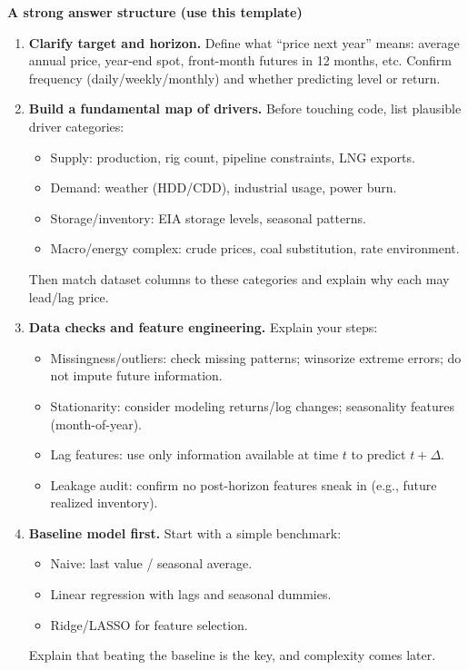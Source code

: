 \documentclass[11pt,letterpaper,openany]{book}
\begin{document}
\textbf{A strong answer structure (use this template)}
\begin{enumerate}
  \item \textbf{Clarify target and horizon.} Define what ``price next year'' means: average annual price, year-end spot, front-month futures in 12 months, etc. Confirm frequency (daily/weekly/monthly) and whether predicting level or return.

  \item \textbf{Build a fundamental map of drivers.} Before touching code, list plausible driver categories:
  \begin{itemize}
    \item Supply: production, rig count, pipeline constraints, LNG exports.
    \item Demand: weather (HDD/CDD), industrial usage, power burn.
    \item Storage/inventory: EIA storage levels, seasonal patterns.
    \item Macro/energy complex: crude prices, coal substitution, rate environment.
  \end{itemize}
  Then match dataset columns to these categories and explain why each may lead/lag price.

  \item \textbf{Data checks and feature engineering.} Explain your steps:
  \begin{itemize}
    \item Missingness/outliers: check missing patterns; winsorize extreme errors; do not impute future information.
    \item Stationarity: consider modeling returns/log changes; seasonality features (month-of-year).
    \item Lag features: use only information available at time $t$ to predict $t + \Delta$.
    \item Leakage audit: confirm no post-horizon features sneak in (e.g., future realized inventory).
  \end{itemize}

  \item \textbf{Baseline model first.} Start with a simple benchmark:
  \begin{itemize}
    \item Naive: last value / seasonal average.
    \item Linear regression with lags and seasonal dummies.
    \item Ridge/LASSO for feature selection.
  \end{itemize}
  Explain that beating the baseline is the key, and complexity comes later.


\end{enumerate}
\end{document}
